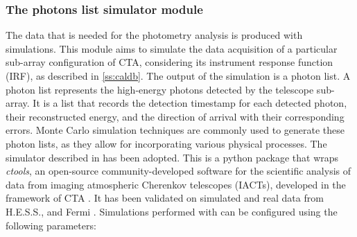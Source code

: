 \subsubsection{The photons list simulator module}
\label{ss:dl3-simulator}
The data that is needed for the photometry analysis is produced with simulations. This module aims to simulate the data acquisition of a particular sub-array configuration of CTA, considering its instrument response function (IRF), as described in \autoref{ss:caldb}. The output of the simulation is a photon list. A photon list represents the high-energy photons detected by the telescope sub-array. It is a list that records the detection timestamp for each detected photon, their reconstructed energy, and the direction of arrival with their corresponding errors. Monte Carlo simulation techniques are commonly used to generate these photon lists, as they allow for incorporating various physical processes. The simulator described in \cite{dipiano2022ctasagsci} has been adopted. This is a python package that wraps \textit{ctools}, an open-source community-developed software for the scientific analysis of data from imaging atmospheric Cherenkov telescopes (IACTs), developed in the framework of CTA \cite{Knodlseder_2016}. It has been validated on simulated and real data from H.E.S.S., and Fermi \cite{Knodlseder_2019}. 
Simulations performed with \cite{dipiano2022ctasagsci} can be configured using the following parameters: 
